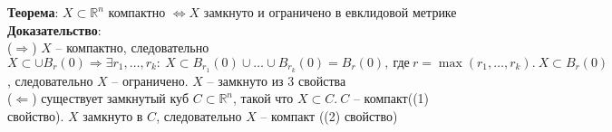 	\textbf{Теорема}: $X \subset \mathbb{R}^n$ компактно $\Leftrightarrow X$ замкнуто и ограничено в евклидовой метрике\\
	\textbf{Доказательство}:\\
	($\Rightarrow$) $X$ -- компактно, следовательно $X \subset \cup B_r (0) \Rightarrow \exists r_1,\ldots, r_k:\ X\subset B_{r_1} (0) \cup\ldots \cup B_{r_k}(0) = B_r(0),\ \text{где}\ r = \max(r_1,\ldots ,r_k).\ X\subset B_r(0)$, следовательно $X$ -- ограничено. $X$ -- замкнуто из 3 свойства\\
	($\Leftarrow$) существует замкнутый куб $C\subset \mathbb{R}^n$, такой что $X\subset C.\ C$ -- компакт((1) свойство). $X$ замкнуто в $C$, следовательно $X$ -- компакт ((2) свойство)\\
	

\newpage
